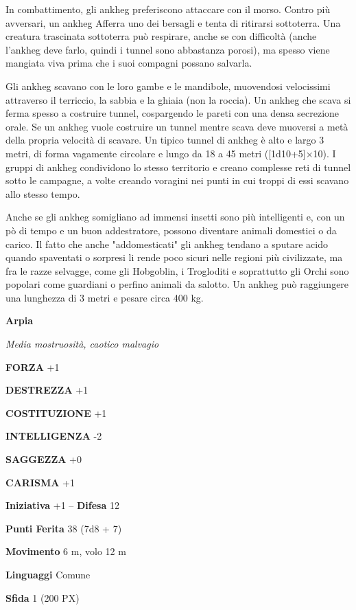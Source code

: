 \begin{multicols}{2}
In combattimento, gli ankheg preferiscono attaccare con il morso. Contro più avversari, un ankheg Afferra uno dei bersagli e tenta di ritirarsi sottoterra. Una creatura trascinata sottoterra può respirare, anche se con difficoltà (anche l'ankheg deve farlo, quindi i tunnel sono abbastanza porosi), ma spesso viene mangiata viva prima che i suoi compagni possano salvarla.

Gli ankheg scavano con le loro gambe e le mandibole, muovendosi velocissimi attraverso il terriccio, la sabbia e la ghiaia (non la roccia). Un ankheg che scava si ferma spesso a costruire tunnel, cospargendo le pareti con una densa secrezione orale. Se un ankheg vuole costruire un tunnel mentre scava deve muoversi a metà della propria velocità di scavare. Un tipico tunnel di ankheg è alto e largo 3 metri, di forma vagamente circolare e lungo da 18 a 45 metri ([1d10+5]×10). I gruppi di ankheg condividono lo stesso territorio e creano complesse reti di tunnel sotto le campagne, a volte creando voragini nei punti in cui troppi di essi scavano allo stesso tempo.

Anche se gli ankheg somigliano ad immensi insetti sono più intelligenti e, con un pò di tempo e un buon addestratore, possono diventare animali domestici o da carico. Il fatto che anche "addomesticati" gli ankheg tendano a sputare acido quando spaventati o sorpresi li rende poco sicuri nelle regioni più civilizzate, ma fra le razze selvagge, come gli Hobgoblin, i Trogloditi e soprattutto gli Orchi sono popolari come guardiani o perfino animali da salotto. Un ankheg può raggiungere una lunghezza di 3 metri e pesare circa 400 kg.

\medskip{}\textbf{Arpia}

\textit{Media mostruosità, caotico malvagio}

\textbf{FORZA} +1

\textbf{DESTREZZA} +1

\textbf{COSTITUZIONE} +1

\textbf{INTELLIGENZA} -2

\textbf{SAGGEZZA} +0

\textbf{CARISMA} +1

\textbf{Iniziativa} +1 -- \textbf{Difesa} 12

\textbf{Punti Ferita} 38 (7d8 + 7)

\textbf{Movimento} 6 m, volo 12 m

\textbf{Linguaggi} Comune

\textbf{Sfida} 1 (200 PX)


\end{multicols}
